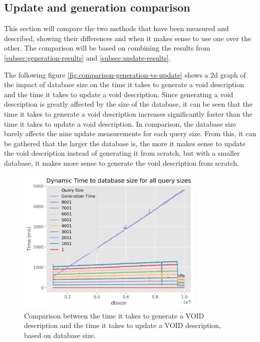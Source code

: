 \subsection{Update and generation comparison}\label{subsec:update-generation-comparison}
This section will compare the two methods that have been measured and described, showing their differences and when it makes sense to use one over the other. The comparison will be based on combining the results from \autoref{subsec:generation-results} and \autoref{subsec:update-results}.

The following figure \autoref{fig:comparison-generation-vs-update} shows a 2d graph of the impact of database size on the time it takes to generate a \gls{void} description and the time it takes to update a \gls{void} description. Since generating a \gls{void} description is greatly affected by the size of the database, it can be seen that the time it takes to generate a \gls{void} description increases significantly faster than the time it takes to update a \gls{void} description. In comparison, the database size barely affects the nine update measurements for each query size. From this, it can be gathered that the larger the database is, the more it makes sense to update the \gls{void} description instead of generating it from scratch, but with a smaller database, it makes more sense to generate the \gls{void} description from scratch.


\begin{figure}
    \centering
    \includegraphics[width=0.8\textwidth]{figures/comparison-Generation-vs-Update.png}
    \caption{Comparison between the time it takes to generate a VOID description and the time it takes to update a VOID description, based on database size.}
    \label{fig:comparison-generation-vs-update}
\end{figure}

